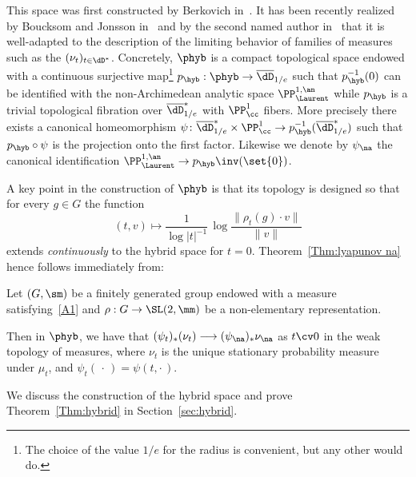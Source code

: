 This space was first constructed by Berkovich in~\cite{berko}. It has been recently realized by Boucksom and Jonsson in~\cite{boucksom-jonsson} and by the second named author in~\cite{degeneration} that it is well-adapted to the description of the limiting behavior of families of measures such as the $(\nu_t)_{t\in \dD^*}$. Concretely, $\phyb$ is a compact topological space endowed with a continuous surjective map\footnote{The choice of the value $1/e$ for the radius is convenient, but any other would do.} $p_{\hyb}: \phyb \to \overline \dD_{1/e}$ such that $p_{\hyb}^{-1}(0)$ can be identified with the non-Archimedean analytic space $\PP^{1,\an}_{\Laurent}$ while $p_{\hyb}$ is a trivial topological fibration over $\overline \dD_{1/e}^*$ with $\PP^1_\cc$ fibers. More precisely there exists a canonical homeomorphism $\psi\colon \overline\dD_{1/e}^* \times \PP^1_\cc \rightarrow p_{\hyb}^{-1}(\overline\dD_{1/e}^*) $ such that $p_{\hyb} \circ \psi$ is the projection onto the first factor. Likewise we denote by $\psi_\na$ the canonical identification $\PP^{1,\an}_{\Laurent} \to p_{\hyb}\inv(\set{0})$.

A key point in the construction of $\phyb$ is that its topology is designed so that for every $g\in G$ the function
\[
(t,v) \longmapsto \frac1{\log|t|^{-1}} \, \log \frac{\|\rho_t(g)\cdot v\|}{\| v \|}
\]
extends \emph{continuously} to the hybrid space for $t=0$. Theorem~\ref{Thm:lyapunov na} hence follows immediately from:

\begin{mthm}\label{Thm:hybrid}
Let $(G, \sm)$ be a finitely generated group endowed with a measure satisfying~\eqref{A1} and $\rho: G\to \SL(2, \mm)$ be a non-elementary representation.

Then in $\phyb$, we have that $ (\psi_{t})_*(\nu_t) \longrightarrow (\psi_\na)_*\nu_{\na}$ as $t\cv 0$ in the weak topology of measures, where $\nu_t$ is the unique stationary probability measure under $\mu_t$, and $\psi_t({\,\cdot\,}) =\psi(t,\cdot\,)$.
\end{mthm}

We discuss the construction of the hybrid space and prove Theorem~\ref{Thm:hybrid} in Section~\ref{sec:hybrid}.



